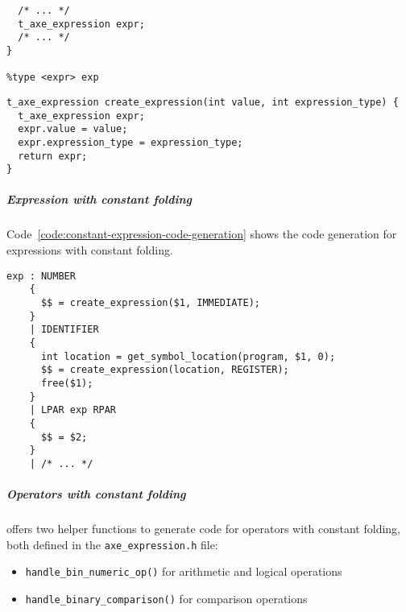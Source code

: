 \documentclass[english]{article}
\begin{document}
\begin{onepage}
  \begin{lstlisting}[language=LANCE, caption={Constant expression grammar rules in \texttt{acse.y}}, label={code:constant-expression-grammar}]
%union {
  /* ... */
  t_axe_expression expr;
  /* ... */
}

%type <expr> exp
\end{lstlisting}
\end{onepage}

\begin{onepage}
  \begin{lstlisting}[language=LANCE, caption={Helper function to create a new expression in \texttt{acse\_struct.h}}, label={code:create-expression}]
t_axe_expression create_expression(int value, int expression_type) {
  t_axe_expression expr;
  expr.value = value;
  expr.expression_type = expression_type;
  return expr;
}
\end{lstlisting}
\end{onepage}

\subparagraph*{Expression with constant folding}

Code~\ref{code:constant-expression-code-generation} shows the code generation for expressions with constant folding.

\begin{onepage}
  \begin{lstlisting}[language=LANCE, caption={Expression with constant folding code generation}, label={code:constant-expression-code-generation}]
exp : NUMBER
    {
      $$ = create_expression($1, IMMEDIATE);
    }
    | IDENTIFIER
    {
      int location = get_symbol_location(program, $1, 0);
      $$ = create_expression(location, REGISTER);
      free($1);
    }
    | LPAR exp RPAR
    {
      $$ = $2;
    }
    | /* ... */
\end{lstlisting}
\end{onepage}

\subparagraph*{Operators with constant folding}

\acse offers two helper functions to generate code for operators with constant folding, both defined in the \texttt{axe\_expression.h} file:

\begin{itemize}[label=\textbf{\texttt{>}}]
  \item \texttt{handle\_bin\_numeric\_op()} for arithmetic and logical operations
  \item \texttt{handle\_binary\_comparison()} for comparison operations
\end{itemize}
\end{document}
